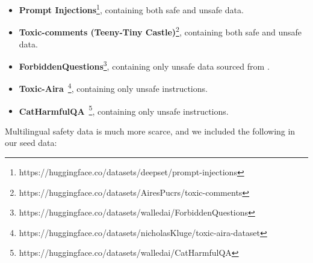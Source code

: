 \begin{itemize}
    \item \textbf{Prompt Injections}\footnote{https://huggingface.co/datasets/deepset/prompt-injections}, containing both safe and unsafe data. 
    \item \textbf{Toxic-comments (Teeny-Tiny Castle)}\footnote{https://huggingface.co/datasets/AiresPucrs/toxic-comments}, containing both safe and unsafe data.
    \item \textbf{ForbiddenQuestions}\footnote{https://huggingface.co/datasets/walledai/ForbiddenQuestions}, containing only unsafe data sourced from \citep{shen2024anything}.    
    \item \textbf{Toxic-Aira}~\citep{correa2024dynamic}\footnote{https://huggingface.co/datasets/nicholasKluge/toxic-aira-dataset}, containing only unsafe instructions. 
    \item \textbf{CatHarmfulQA}~\citep{bhardwaj2024language}\footnote{https://huggingface.co/datasets/walledai/CatHarmfulQA}, containing only unsafe instructions.
\end{itemize}
Multilingual safety data is much more scarce, and we included the following in our seed data:
